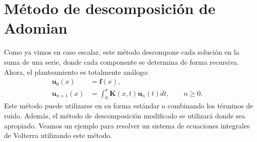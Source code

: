 \section{Método de descomposición de Adomian}
Como ya vimos en caso escalar, este método descompone cada solución en la suma de una serie, donde cada componente se determina de forma recursiva. Ahora, el planteamiento es totalmente análogo:
\begin{align}
	\textbf{u}_0(x) &= \textbf{f}(x),      &   \\
	\textbf{u}_{n+1}(x) &= \int_{0}^{x} \textbf{K}(x,t)\textbf{u}_n(t)dt, \qquad n \geqslant 0.         & 
\end{align}
Este método puede utilizarse en su forma estándar o combinando los términos de ruido. Además, el método de descomposición modificado se utilizará donde sea apropiado. Veamos un ejemplo para resolver un sistema de ecuaciones integrales de Volterra utilizando este método.
